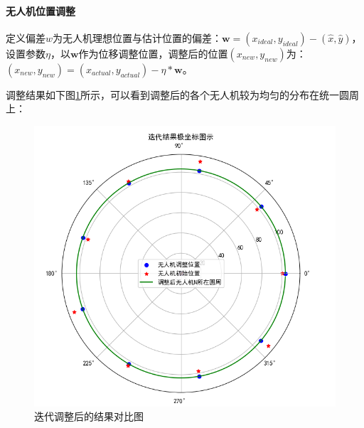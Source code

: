 \documentclass[withoutpreface,bwprint]{cumcmthesis} %
\begin{document}
			\paragraph{无人机位置调整}
			定义偏差$w$为无人机理想位置与估计位置的偏差：$\boldsymbol{w}=(x_{ideal},y_{ideal}) - (\hat{x},\hat{y})$，设置参数$\eta{}$，以$\boldsymbol{w}$作为位移调整位置，调整后的位置$(x_{new},y_{new})$为：$(x_{new},y_{new})= (x_{actual},y_{actual}) - \eta{} * \boldsymbol{w}$。
			\par 调整结果如下图\ref{Polar}所示，可以看到调整后的各个无人机较为均匀的分布在统一圆周上：
			\begin{figure}[H]
				\centering
				\includegraphics[width=0.5\linewidth]{./figures/Polar Axis}
				\caption{迭代调整后的结果对比图}
				\label{Polar}
			\end{figure}
\end{document}
